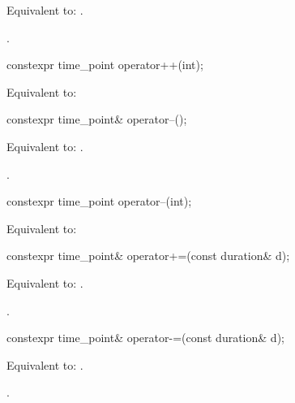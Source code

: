 \begin{itemdescr}
\pnum
\effects
Equivalent to: .

\pnum
\returns
{}.
\end{itemdescr}

%
\begin{itemdecl}
constexpr time_point operator++(int);
\end{itemdecl}

\begin{itemdescr}
\pnum
\effects
Equivalent to: 
\end{itemdescr}

%
\begin{itemdecl}
constexpr time_point& operator--();
\end{itemdecl}

\begin{itemdescr}
\pnum
\effects
Equivalent to: .

\pnum
\returns
{}.
\end{itemdescr}

%
\begin{itemdecl}
constexpr time_point operator--(int);
\end{itemdecl}

\begin{itemdescr}
\pnum
\effects
Equivalent to: 
\end{itemdescr}

%
\begin{itemdecl}
constexpr time_point& operator+=(const duration& d);
\end{itemdecl}

\begin{itemdescr}
\pnum
\effects
Equivalent to: .

\pnum
\returns
{}.
\end{itemdescr}

%
\begin{itemdecl}
constexpr time_point& operator-=(const duration& d);
\end{itemdecl}

\begin{itemdescr}
\pnum
\effects
Equivalent to: .

\pnum
\returns
{}.
\end{itemdescr}

